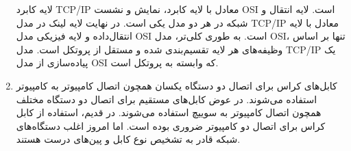 \documentclass{perassignments}
\begin{document}
\begin{enumerate}
\begin{description}
		 \end{description}
	 	لایه کابرد TCP/IP معادل با لایه کابرد، نمایش و نشست OSI است. لایه انتقال و شبکه در هر دو مدل یکی است. در نهایت لایه لینک در مدل TCP/IP معادل با لایه انتقال‌داده و لایه فیزیکی مدل OSI است. به طوری کلی‌تر، مدل OSI، تنها بر اساس وظیفه‌های هر لایه تقسیم‌بندی شده و مستقل از پروتکل است. مدل TCP/IP یک پیاده‌سازی از مدل OSI که وابسته به پروتکل است.
		\item 
		کابل‌های کراس برای اتصال دو دستگاه یکسان همچون اتصال کامپیوتر به کامپیوتر استفاده می‌شوند. در عوض کابل‌های مستقیم برای اتصال دو دستگاه مختلف همچون اتصال کامپیوتر به سوییچ استفاده می‌شوند. در قدیم، استفاده از کابل کراس برای اتصال دو کامپیوتر ضروری بوده است. اما امروز اغلب دستگاه‌های شبکه قادر به تشخیص نوع کابل و پین‌های درست هستند.
	\end{enumerate}
\end{document}
